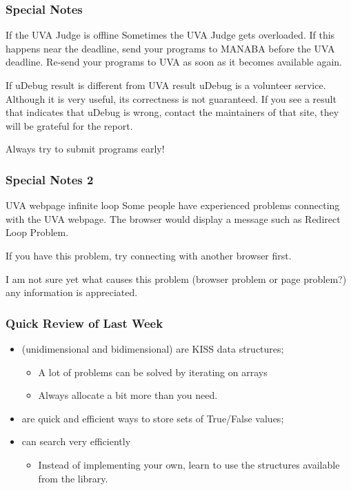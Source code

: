 \documentclass{beamer}
\begin{document}
\begin{frame}
  \frametitle{Special Notes}
  \begin{block}{If the UVA Judge is offline}
    Sometimes the UVA Judge gets overloaded. If this happens near the
    deadline, send your programs to MANABA before the UVA
    deadline. Re-send your programs to UVA as soon as it becomes
    available again.
  \end{block}
  \begin{block}{If uDebug result is different from UVA result}
    uDebug is a volunteer service. Although it is very useful, its
    correctness is not guaranteed. If you see a result that indicates
    that uDebug is wrong, contact the maintainers of that site, they
    will be grateful for the report.
  \end{block}

  Always try to submit programs early!
\end{frame}

\begin{frame}
  \frametitle{Special Notes 2}
  \begin{block}{UVA webpage infinite loop}
    Some people have experienced problems connecting with the UVA webpage. The 
    browser would display a message such as \alert{Redirect Loop Problem}. 

    \bigskip

    If you have this problem, try connecting with another browser first. 

    \bigskip
    
    I am not sure yet what causes this problem (browser problem or page problem?) 
    any information is appreciated.
  \end{block}
\end{frame}

\begin{frame}
  \frametitle{Quick Review of Last Week}
  \begin{itemize}
  \item {} (unidimensional and bidimensional) are 
    KISS data structures;
    \begin{itemize}
    \item A lot of problems can be solved by iterating on arrays
    \item Always allocate a bit more than you need.
    \end{itemize}

    \medskip

  \item {} are quick and efficient ways to store sets of
    True/False values;

    \medskip
    
  \item {} can search very efficiently
    \begin{itemize}
    \item Instead of implementing your own, learn to use the
      structures available from the library.
    \end{itemize}
  \end{itemize}
\end{frame}
\end{document}

